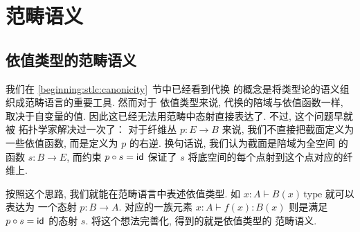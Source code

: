 \chapter{范畴语义}
\section{依值类型的范畴语义}
我们在 \ref{beginning:stlc:canonicity}~节中已经看到代换
的概念是将类型论的语义组织成范畴语言的重要工具. 然而对于
依值类型来说, 代换的陪域与依值函数一样, 取决于自变量的值.
因此这已经无法用范畴中态射直接表达了. 不过, 这个问题早就被
拓扑学家解决过一次了： 对于纤维丛 \(p : E \to B\)
来说, 我们不直接把截面定义为一些依值函数, 而是定义为
\(p\) 的右逆. 换句话说, 我们认为截面是陪域为全空间
的函数 \(s : B \to E\), 而约束 \(p \circ s = \textsf{id}\)
保证了 \(s\) 将底空间的每个点射到这个点对应的纤维上.

按照这个思路, 我们就能在范畴语言中表述依值类型. 如
\(x{:}A \vdash B(x)\,\text{type}\) 就可以表达为
一个态射 \(p : B \to A\). 对应的一族元素
\(x{:}A \vdash f(x) : B(x)\) 则是满足 \(p \circ s = \textsf{id}\)
的态射 \(s\). 将这个想法完善化, 得到的就是依值类型的
范畴语义.

